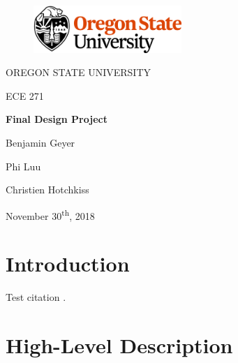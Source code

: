 \documentclass[12pt]{article}
\begin{document}
\begin{titlepage}
  \begin{center} \LARGE
    \begin{figure}[ht]
      \centering
      \includegraphics[width=0.5\textwidth]{osu_logo.png}
    \end{figure}

    \vspace{0.25in}

    OREGON STATE UNIVERSITY

    \vspace{0.25in}

    ECE 271

    \vfill

    \textbf{Final Design Project}

    \vspace{0.25in}

    Benjamin Geyer

    Phi Luu

    Christien Hotchkiss

    \vfill

    November 30\textsuperscript{th}, 2018
  \end{center}
\end{titlepage}

\tableofcontents \newpage

\section{Introduction}

Test citation \cite{SparkFunSpi}.

\section{High-Level Description}

\end{document}
